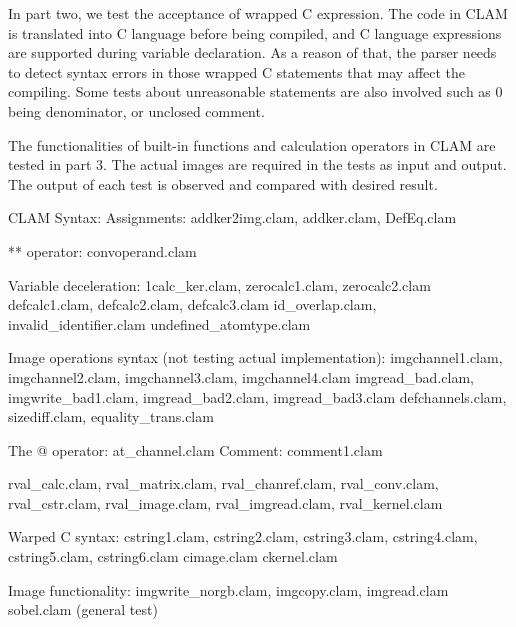 In part two, we test the acceptance of wrapped C expression. The code in CLAM is translated into C language before being compiled, and C language expressions are supported during variable declaration. As a reason of that,  the parser needs to detect syntax errors in those wrapped C statements that may affect the compiling. Some tests about unreasonable statements are also involved such as 0 being denominator, or unclosed comment.

The functionalities of built-in functions and calculation operators in CLAM are tested in part 3. The actual images are required in the tests as input and output. The output of each test is observed and compared with desired result.

CLAM Syntax:
	Assignments: 
		addker2img.clam, addker.clam, DefEq.clam

	** operator:
		convoperand.clam

	Variable deceleration:
		1calc_ker.clam, zerocalc1.clam, zerocalc2.clam
		defcalc1.clam, defcalc2.clam, defcalc3.clam
id_overlap.clam, invalid_identifier.clam
		undefined_atomtype.clam
		

	Image operations syntax (not testing actual implementation):
		imgchannel1.clam, imgchannel2.clam, imgchannel3.clam, imgchannel4.clam
		imgread_bad.clam, imgwrite_bad1.clam, imgread_bad2.clam, imgread_bad3.clam
		defchannels.clam, sizediff.clam, equality_trans.clam

	The @ operator: at_channel.clam
	Comment: comment1.clam

	rval_calc.clam, rval_matrix.clam, rval_chanref.clam, rval_conv.clam, 
	rval_cstr.clam, rval_image.clam, rval_imgread.clam, rval_kernel.clam


Warped C syntax:
	cstring1.clam, cstring2.clam, cstring3.clam, cstring4.clam, cstring5.clam, cstring6.clam
	cimage.clam
	ckernel.clam

Image functionality:
	imgwrite_norgb.clam,  imgcopy.clam,  imgread.clam
	sobel.clam (general test)
